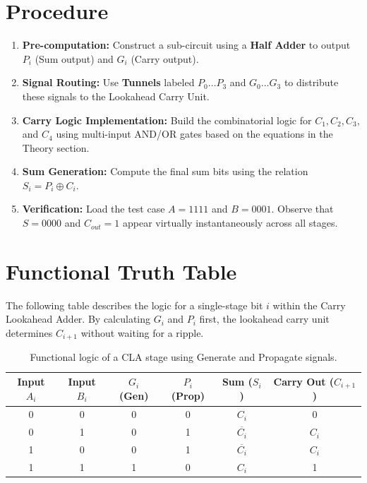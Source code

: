 \documentclass[11pt, a4paper]{article}
\begin{document}
\section{Procedure}
\begin{enumerate}
    \item \textbf{Pre-computation:} Construct a sub-circuit using a \textbf{Half Adder} to output $P_i$ (Sum output) and $G_i$ (Carry output).
    \item \textbf{Signal Routing:} Use \textbf{Tunnels} labeled $P_0 \dots P_3$ and $G_0 \dots G_3$ to distribute these signals to the Lookahead Carry Unit.
    \item \textbf{Carry Logic Implementation:} Build the combinatorial logic for $C_1, C_2, C_3,$ and $C_4$ using multi-input AND/OR gates based on the equations in the Theory section.
    \item \textbf{Sum Generation:} Compute the final sum bits using the relation $S_i = P_i \oplus C_i$.
    \item \textbf{Verification:} Load the test case $A=1111$ and $B=0001$. Observe that $S=0000$ and $C_{out}=1$ appear virtually instantaneously across all stages.
\end{enumerate}

\section{Functional Truth Table}
The following table describes the logic for a single-stage bit $i$ within the Carry Lookahead Adder. By calculating $G_i$ and $P_i$ first, the lookahead carry unit determines $C_{i+1}$ without waiting for a ripple.

\begin{table}[H]
    \centering
    \renewcommand{\arraystretch}{1.3}
    \begin{tabularx}{0.85\textwidth}{cc|cc|c|c}
        \toprule
        \rowcolor{lightgray!30} \textbf{Input $A_i$} & \textbf{Input $B_i$} & \textbf{$G_i$ (Gen)} & \textbf{$P_i$ (Prop)} & \textbf{Sum ($S_i$)} & \textbf{Carry Out ($C_{i+1}$)} \\
        \midrule
        0 & 0 & 0 & 0 & $C_i$ & 0 \\
        0 & 1 & 0 & 1 & $\overline{C_i}$ & $C_i$ \\
        1 & 0 & 0 & 1 & $\overline{C_i}$ & $C_i$ \\
        1 & 1 & 1 & 0 & $C_i$ & 1 \\
        \bottomrule
    \end{tabularx}
    \caption{Functional logic of a CLA stage using Generate and Propagate signals.}
    \label{tab:cla_logic}
\end{table}
\end{document}
